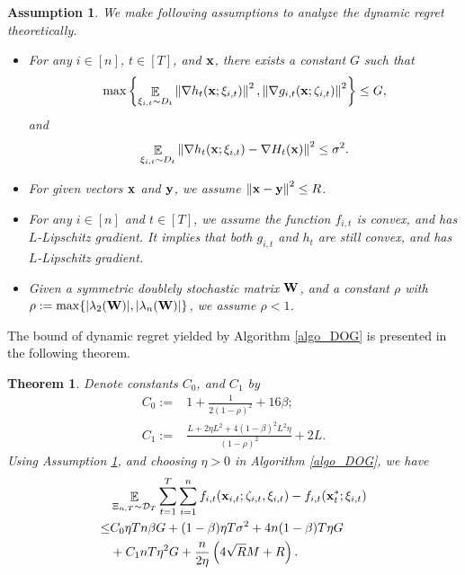 \documentclass{article}
\newtheorem{Theorem}{\bf{Theorem}}
\newtheorem{Assumption}{\bf{Assumption}}
\begin{document}
\begin{Assumption}
\label{assumption_bounded_gradient_domain}
We make following assumptions to analyze the dynamic regret theoretically.
\begin{itemize}
\item For any $i\in[n]$, $t\in[T]$, and ${\bf x}$, there exists a constant $G$ such that
\begin{align}
\nonumber
\max\left\{ \mathop{\mathbb{E}}_{ \xi_{i,t} \sim D_t }\left\lVert\nabla h_t({\bf x};\xi_{i,t})\right\rVert^2,  \left\lVert\nabla g_{i,t}({\bf x};\zeta_{i,t})\right\rVert^2 \right\} \le G,
\end{align} and 
\begin{align}
\nonumber
\mathop{\mathbb{E}}_{ \xi_{i,t} \sim D_t } \left\lVert\nabla h_t({\bf x}; \xi_{i,t}) - \nabla H_t({\bf x})\right\rVert^2 \le \sigma^2.
\end{align}
\item For given vectors ${\bf x}$ and ${\bf y}$, we assume $\left\lVert{\bf x}-{\bf y}\right\rVert^2 \le R$.
\item  For any $i\in[n]$ and $t\in[T]$, we assume the function $f_{i,t}$ is convex, and has $L$-Lipschitz gradient. It implies that both $g_{i,t}$ and $h_t$ are still convex, and has $L$-Lipschitz gradient.
\item Given a symmetric doublely stochastic matrix ${\bf W}$, and a constant $\rho$ with $\rho := \max\{ |\lambda_2({\bf W})|, |\lambda_n({\bf W})| \}$, we assume $\rho <1$.
\end{itemize}
\end{Assumption}




The bound of dynamic regret yielded by Algorithm \ref{algo_DOG} is presented in the following theorem. 
\begin{Theorem}
\label{theorem_regret_upper_bound}
Denote constants $C_0$, and $C_1$ by
\begin{align}
\nonumber
C_0 := & 1 + \frac{1}{2(1-\rho)^2}+16\beta; \\ \nonumber
C_1 := & \frac{L + 2\eta L^2  + 4(1-\beta)^2L^2 \eta}{(1-\rho)^2} +2L.
\end{align} Using Assumption \ref{assumption_bounded_gradient_domain}, and choosing $\eta>0$ in Algorithm \ref{algo_DOG}, we have
\begin{align}
\nonumber
& \mathop{\mathbb{E}}_{ \Xi_{n,T} \sim \mathcal{D}_{T} } \sum_{t=1}^T\sum_{i=1}^n f_{i,t}({\bf x}_{i,t};\zeta_{i,t},\xi_{i,t}) - f_{i,t}({\bf x}_t^\ast;\xi_{i,t}) \\ \nonumber
\le & C_0\eta T n\beta  G + (1-\beta)\eta T\sigma^2 + 4n(1-\beta)T\eta G \\ \nonumber
& + C_1  nT\eta^2 G    + \frac{n}{2\eta}\left(  4\sqrt{R}M + R   \right).
\end{align}

\end{Theorem}
\end{document}
